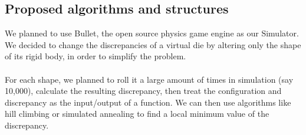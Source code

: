 \subsection{Proposed algorithms and structures}
We planned to use Bullet, the open source physics game engine as our Simulator. We decided to change the discrepancies of a virtual die by altering only the shape of its rigid body, in order to simplify the problem.\\\\
For each shape, we planned to roll it a large amount of times in simulation (say 10,000), calculate the resulting discrepancy, then treat the configuration and discrepancy as the input/output of a function. We can then use algorithms like hill climbing or simulated annealing to find a local minimum value of the discrepancy.
